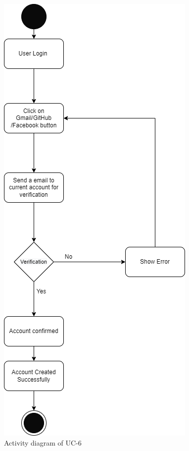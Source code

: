 \begin{figure}[H]
    \centering
    \includegraphics[scale=0.5]{./diagrams/Activity Diagram/ad-06.png}
    \caption{Activity diagram of UC-6}
    \label{fig:act-06}

\end{figure}


